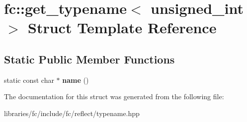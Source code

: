 \hypertarget{structfc_1_1get__typename_3_01unsigned__int_01_4}{}\section{fc\+:\+:get\+\_\+typename$<$ unsigned\+\_\+int $>$ Struct Template Reference}
\label{structfc_1_1get__typename_3_01unsigned__int_01_4}
\subsection*{Static Public Member Functions}
\begin{DoxyCompactItemize}
\item 
\mbox{\label{structfc_1_1get__typename_3_01unsigned__int_01_4_aca5289db1b89b9fb74f540c948dcdcf6}} 
static const char $\ast$ {\bfseries name} ()
\end{DoxyCompactItemize}


The documentation for this struct was generated from the following file\+:\begin{DoxyCompactItemize}
\item 
libraries/fc/include/fc/reflect/typename.\+hpp\end{DoxyCompactItemize}
